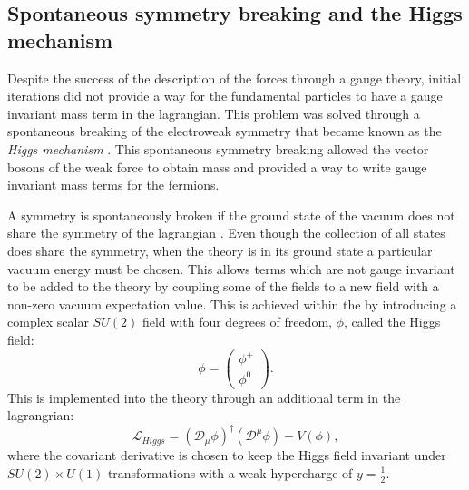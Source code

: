 \subsection{Spontaneous symmetry breaking and the Higgs mechanism}

Despite the success of the description of the \SM forces through a
gauge theory, initial iterations did not provide a way for the
fundamental \SM particles to have a gauge invariant mass term in the
lagrangian. This problem was solved through a spontaneous breaking of
the electroweak symmetry that became known as the \emph{Higgs
mechanism}
\cite{Englert:1964et,Higgs:1964ia,Higgs:1964pj,Guralnik:1964eu,Higgs:1966ev,Kibble:1967sv}.
This spontaneous symmetry breaking allowed the vector bosons of the
weak force to obtain mass and provided a way to write gauge invariant
mass terms for the fermions.

A symmetry is spontaneously broken if the ground state of
the vacuum does not share the symmetry of the lagrangian
\cite{Griffiths:111880}. Even though the collection of all states does
share the symmetry, when the theory is in its ground state a
particular vacuum energy must be chosen. This allows terms which are
not gauge invariant to be added to the theory by coupling some of the
fields to a new field with a non-zero vacuum expectation value. This
is achieved within the \SM by introducing a complex scalar $SU(2)$
field with four degrees of freedom, $\phi$, called the Higgs field:
\begin{equation}
\phi=\left(\begin{array}{c}\phi^+ \\ \phi^0 \end{array}\right).
\end{equation}
This is implemented into the theory through an additional term in the
\SM lagrangrian:
\begin{equation}
\mathcal{L}_{Higgs} =
(\mathcal{D}_{\mu}\phi)^{\dag}(\mathcal{D}^{\mu}\phi) - V(\phi),
\end{equation}
where the covariant derivative is chosen to keep the Higgs field
invariant under $SU(2)\times U(1)$ transformations with a weak
hypercharge of $y=\frac{1}{2}$.

